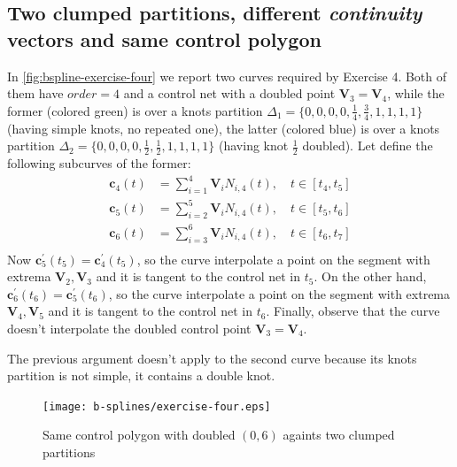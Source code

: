 \documentclass{article}
\begin{document}
\subsection{Two clumped partitions, different \emph{continuity} vectors
    and same control polygon}
In \autoref{fig:bspline-exercise-four} we report two curves required by Exercise 4.
Both of them have $order = 4$ and a control net with a doubled point
$\mathbf{V}_{3} = \mathbf{V}_{4}$, while the former (colored green)
is over a knots partition
$\Delta_{1} = \lbrace 0,0,0,0,\frac{1}{4}, \frac{3}{4}, 1,1,1,1 \rbrace$
(having simple knots, no repeated one), the latter (colored blue) is over
a knots partition
$\Delta_{2} = \lbrace 0,0,0,0,\frac{1}{2}, \frac{1}{2}, 1,1,1,1 \rbrace$ (having
knot $\frac{1}{2}$ doubled). Let define the following subcurves of the former:
\begin{displaymath}
    \begin{split}
        \mathbf{c}_{4}(t) &= \sum_{i=1}^{4}{\mathbf{V}_{i}N_{i,4}(t)}, \quad
            t \in [t_{4}, t_{5}] \\
        \mathbf{c}_{5}(t) &= \sum_{i=2}^{5}{\mathbf{V}_{i}N_{i,4}(t)}, \quad
            t \in [t_{5}, t_{6}] \\
        \mathbf{c}_{6}(t) &= \sum_{i=3}^{6}{\mathbf{V}_{i}N_{i,4}(t)}, \quad
            t \in [t_{6}, t_{7}] \\
    \end{split}
\end{displaymath}
Now $\mathbf{c}_{5}^{\prime}(t_{5}) = \mathbf{c}_{4}^{\prime}(t_{5})$, so the
curve interpolate a point on the segment with extrema $\mathbf{V}_{2}, \mathbf{V}_{3}$
and it is tangent to the control net in $t_{5}$. On the other hand,
$\mathbf{c}_{6}^{\prime}(t_{6}) = \mathbf{c}_{5}^{\prime}(t_{6})$, so the
curve interpolate a point on the segment with extrema $\mathbf{V}_{4}, \mathbf{V}_{5}$
and it is tangent to the control net in $t_{6}$.
Finally, observe that the curve doesn't
interpolate the doubled control point $\mathbf{V}_{3} = \mathbf{V}_{4}$.

The previous argument doesn't apply to the second curve because its
knots partition is not simple, it contains a double knot.

\begin{figure}[h!]
  \centering
  \texttt{[image: b-splines/exercise-four.eps]}
  \caption{Same control polygon with doubled $(0,6)$ againts two clumped partitions}
  \label{fig:bspline-exercise-four}
\end{figure}
\end{document}
